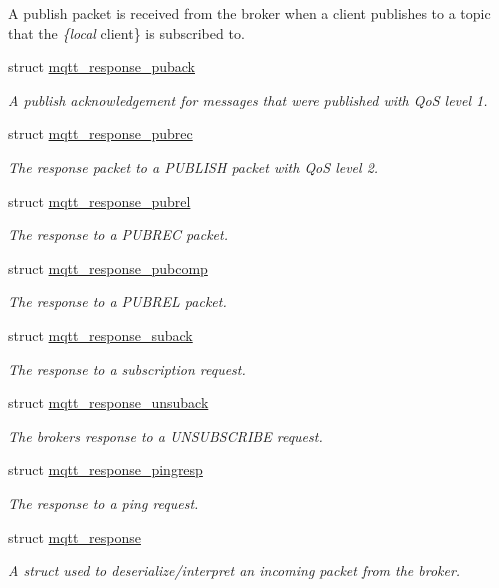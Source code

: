 \begin{DoxyCompactItemize}
\begin{DoxyCompactList}
A publish packet is received from the broker when a client publishes to a topic that the {\itshape \{local} client\} is subscribed to. \end{DoxyCompactList}\item 
struct \hyperlink{structmqtt__response__puback}{mqtt\+\_\+response\+\_\+puback}
\begin{DoxyCompactList}\small\item\em A publish acknowledgement for messages that were published with QoS level 1. \end{DoxyCompactList}\item 
struct \hyperlink{structmqtt__response__pubrec}{mqtt\+\_\+response\+\_\+pubrec}
\begin{DoxyCompactList}\small\item\em The response packet to a P\+U\+B\+L\+I\+SH packet with QoS level 2. \end{DoxyCompactList}\item 
struct \hyperlink{structmqtt__response__pubrel}{mqtt\+\_\+response\+\_\+pubrel}
\begin{DoxyCompactList}\small\item\em The response to a P\+U\+B\+R\+EC packet. \end{DoxyCompactList}\item 
struct \hyperlink{structmqtt__response__pubcomp}{mqtt\+\_\+response\+\_\+pubcomp}
\begin{DoxyCompactList}\small\item\em The response to a P\+U\+B\+R\+EL packet. \end{DoxyCompactList}\item 
struct \hyperlink{structmqtt__response__suback}{mqtt\+\_\+response\+\_\+suback}
\begin{DoxyCompactList}\small\item\em The response to a subscription request. \end{DoxyCompactList}\item 
struct \hyperlink{structmqtt__response__unsuback}{mqtt\+\_\+response\+\_\+unsuback}
\begin{DoxyCompactList}\small\item\em The brokers response to a U\+N\+S\+U\+B\+S\+C\+R\+I\+BE request. \end{DoxyCompactList}\item 
struct \hyperlink{structmqtt__response__pingresp}{mqtt\+\_\+response\+\_\+pingresp}
\begin{DoxyCompactList}\small\item\em The response to a ping request. \end{DoxyCompactList}\item 
struct \hyperlink{structmqtt__response}{mqtt\+\_\+response}
\begin{DoxyCompactList}\small\item\em A struct used to deserialize/interpret an incoming packet from the broker. \end{DoxyCompactList}\end{DoxyCompactItemize}
